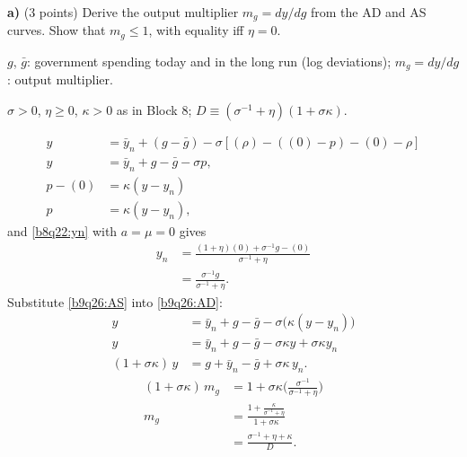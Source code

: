 \textbf{a)} (3 points) Derive the output multiplier $m_g=dy/dg$ from the AD and AS curves. Show that $m_g\le1$, with equality iff $\eta=0$.
\resolespaco
\begin{sol}
\begin{notacao}
\item $g$, $\bar g$: government spending today and in the long run (log deviations); $m_g=dy/dg$: output multiplier.
\item $\sigma>0$, $\eta\ge0$, $\kappa>0$ as in Block 8; $D\equiv(\sigma^{-1}+\eta)(1+\sigma\kappa)$.
\end{notacao}
\begin{align}
y&=\bar y_n+(g-\bar g)-\sigma[(\rho)-((0)-p)-(0)-\rho]\nonumber\\
y&=\bar y_n+g-\bar g-\sigma p, \label{b9q26:AD}\\
p-(0)&=\kappa(y-y_n)\nonumber\\
p&=\kappa(y-y_n), \label{b9q26:AS}
\end{align}
and \eqref{b8q22:yn} with $a=\mu=0$ gives
\begin{align}
y_n&=\frac{(1+\eta)(0)+\sigma^{-1}g-(0)}{\sigma^{-1}+\eta}\nonumber\\
&=\frac{\sigma^{-1}g}{\sigma^{-1}+\eta}. \label{b9q26:yn}
\end{align}
Substitute \eqref{b9q26:AS} into \eqref{b9q26:AD}:
\begin{align}
y&=\bar y_n+g-\bar g-\sigma\big(\kappa(y-y_n)\big)\nonumber\\
y&=\bar y_n+g-\bar g-\sigma\kappa y+\sigma\kappa y_n\nonumber\\
(1+\sigma\kappa)\,y&=g+\bar y_n-\bar g+\sigma\kappa\,y_n. \label{b9q26:comb}
\end{align}
\begin{align}
(1+\sigma\kappa)\,m_g&=1+\sigma\kappa\Big(\frac{\sigma^{-1}}{\sigma^{-1}+\eta}\Big)\nonumber\\
m_g&=\frac{1+\frac{\kappa}{\sigma^{-1}+\eta}}{1+\sigma\kappa}\nonumber\\
&=\frac{\sigma^{-1}+\eta+\kappa}{D}. \label{b9q26:mg}
\end{align}

\end{sol}
